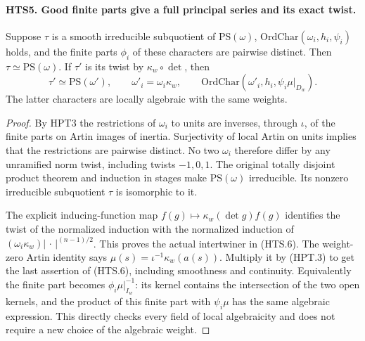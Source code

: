 \paragraph{HTS5. Good finite parts give a full principal series and its exact twist.}
\label{claim:HTS5}
Suppose $\tau$ is a smooth irreducible subquotient of $\mathrm{PS}(\omega)$,
$\mathrm{OrdChar}(\omega_i,h_i,\psi_i)$ holds, and the finite
parts $\phi_i$ of these characters are pairwise distinct.
Then $\tau\simeq\mathrm{PS}(\omega)$.  If $\tau'$ is its twist
by $\kappa_w\circ\det$, then
\[
 \tau'\simeq\mathrm{PS}(\omega'),\qquad
 \omega'_i=\omega_i\kappa_w,\qquad
 \mathrm{OrdChar}(\omega'_i,h_i,\psi_i\mu|_{D_w}).               \tag{HTS.6}
\]
The latter characters are locally algebraic with the same weights.
\begin{proof}
By HPT3 the restrictions of $\omega_i$ to units are inverses,
through $\iota$, of the finite parts on Artin images of inertia.
Surjectivity of local Artin on units implies that the restrictions
are pairwise distinct.  No two $\omega_i$ therefore differ by
any unramified norm twist, including twists $-1,0,1$.
The original totally disjoint product theorem and induction
in stages make $\mathrm{PS}(\omega)$ irreducible.  Its nonzero
irreducible subquotient $\tau$ is isomorphic to it.

The explicit inducing-function map
$f(g)\mapsto\kappa_w(\det g)f(g)$ identifies the twist of the
normalized induction with the normalized induction of
$(\omega_i\kappa_w)|\,\cdot\,|^{(n-1)/2}$.
This proves the actual intertwiner in (HTS.6).  The weight-zero
Artin identity says $\mu(s)=\iota^{-1}\kappa_w(a(s))$.
Multiply it by (HPT.3) to get the last assertion of (HTS.6),
including smoothness and continuity.  Equivalently the finite
part becomes $\phi_i\mu|_{I_w}^{-1}$: its kernel contains the
intersection of the two open kernels, and the product of this
finite part with $\psi_i\mu$ has the same algebraic expression.
This directly checks every field of local algebraicity and
does not require a new choice of the algebraic weight.
\end{proof}

